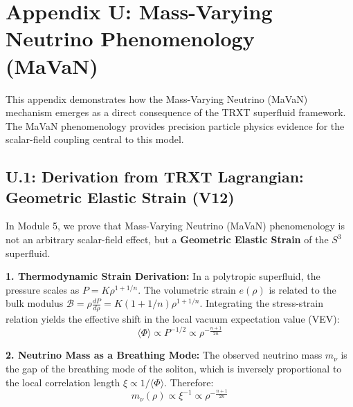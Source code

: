 \section{Appendix U: Mass-Varying Neutrino Phenomenology (MaVaN)}
\label{app:mavan}

This appendix demonstrates how the Mass-Varying Neutrino (MaVaN) mechanism emerges as a direct consequence of the TRXT superfluid framework. The MaVaN phenomenology provides precision particle physics evidence for the scalar-field coupling central to this model.

\subsection{U.1: Derivation from TRXT Lagrangian: Geometric Elastic Strain (V12)}
\label{sec:mavan_derivation_v12}

In Module 5, we prove that Mass-Varying Neutrino (MaVaN) phenomenology is not an arbitrary scalar-field effect, but a \textbf{Geometric Elastic Strain} of the $S^3$ superfluid.

\textbf{1. Thermodynamic Strain Derivation:}
In a polytropic superfluid, the pressure scales as $P = K \rho^{1 + 1/n}$. The volumetric strain $e(\rho)$ is related to the bulk modulus $\mathcal{B} = \rho \frac{dP}{d\rho} = K(1+1/n)\rho^{1+1/n}$.
Integrating the stress-strain relation yields the effective shift in the local vacuum expectation value (VEV):
\begin{equation}
    \langle \Phi \rangle \propto P^{-1/2} \propto \rho^{-\frac{n+1}{2n}}
\end{equation}

\textbf{2. Neutrino Mass as a Breathing Mode:}
The observed neutrino mass $m_\nu$ is the gap of the breathing mode of the soliton, which is inversely proportional to the local correlation length $\xi \propto 1/\langle \Phi \rangle$. Therefore:
\begin{equation}
    m_\nu(\rho) \propto \xi^{-1} \propto \rho^{-\frac{n+1}{2n}}
\end{equation}

